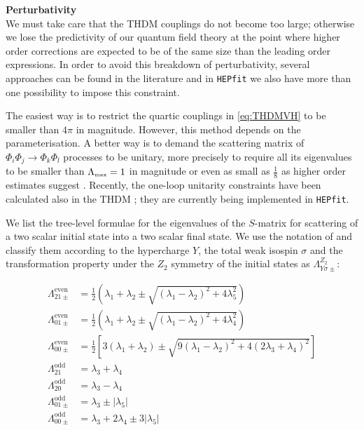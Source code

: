\documentclass[preprint,3p,12pt]{elsarticle}
\newcommand{\HEPfit}{\texttt{HEPfit}\xspace}
\begin{document}
{\textbf{Perturbativity}\\

We must take care that the THDM couplings do not become too large; otherwise we lose the predictivity of our quantum field theory at the point where higher order corrections are expected to be of the same size than the leading order expressions. In order to avoid this breakdown of perturbativity, several approaches can be found in the literature and in \HEPfit we also have more than one possibility to impose this constraint.

The easiest way is to restrict the quartic couplings in \eqref{eq:THDMVH} to be smaller than $4\pi$ in magnitude. However, this method depends on the parameterisation. A better way is to demand the scattering matrix of $\Phi_i \Phi_j\to \Phi_k \Phi_l$ processes to be unitary, more precisely to require all its eigenvalues to be smaller than $\Lambda_{\text{\tiny{max}}}=1$ in magnitude \cite{Huffel:1980sk,Maalampi:1991fb,Kanemura:1993hm,Akeroyd:2000wc,Ginzburg:2005dt} or even as small as $\frac18$ as higher order estimates suggest \cite{Baglio:2014nea,Chowdhury:2015yja}. Recently, the one-loop unitarity constraints have been calculated also in the THDM \cite{Grinstein:2015rtl}; they are currently being implemented in \HEPfit.

We list the tree-level formulae for the eigenvalues of the $S$-matrix for scattering of a two scalar initial state into a two scalar final state. We use the notation of \cite{Ginzburg:2005dt} and classify them according to the hypercharge $Y$, the total weak isospin $\sigma$ and the transformation property under the $Z_2$ symmetry of the initial states as $\Lambda _{Y\sigma \pm}^{Z_2}$:

\begin{align}
 \Lambda _{21\pm}^{\text{even}} &= \frac12 \left( \lambda_1 +\lambda_2 \pm \sqrt{(\lambda_1-\lambda_2)^2+4\lambda_5^2}\right) \nonumber \\
 \Lambda _{01\pm}^{\text{even}} &= \frac12 \left( \lambda_1 +\lambda_2 \pm \sqrt{(\lambda_1-\lambda_2)^2+4\lambda_4^2}\right) \nonumber \\
 \Lambda _{00\pm}^{\text{even}} &= \frac12 \left[ 3\left( \lambda_1 +\lambda_2 \right) \pm \sqrt{9(\lambda_1-\lambda_2)^2+4(2\lambda_3+\lambda_4)^2}\right] \nonumber \\
 \Lambda _{21}^{\text{odd}} &= \lambda_3 + \lambda_4\nonumber \\
 \Lambda _{20}^{\text{odd}} &= \lambda_3 - \lambda_4\nonumber \\
 \Lambda _{01\pm}^{\text{odd}} &= \lambda_3 \pm |\lambda_5|\nonumber \\
 \Lambda _{00\pm}^{\text{odd}} &= \lambda_3 + 2\lambda_4 \pm 3 |\lambda_5|\nonumber
\end{align}

}
\end{document}
